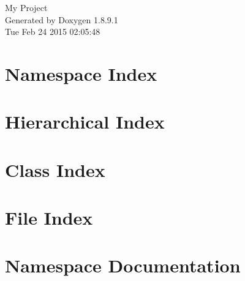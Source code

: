 \documentclass[twoside]{book}
\newcommand{\+}{\discretionary{\mbox{\scriptsize$\hookleftarrow$}}{}{}}
\newcommand{\clearemptydoublepage}{%
  \newpage{\pagestyle{empty}\cleardoublepage}%
}
\begin{document}
\hypersetup{pageanchor=false,
             bookmarks=true,
             bookmarksnumbered=true,
             pdfencoding=unicode
            }
\begin{titlepage}
\vspace*{7cm}
\begin{center}%
{\Large My Project }\\
\vspace*{1cm}
{\large Generated by Doxygen 1.8.9.1}\\
\vspace*{0.5cm}
{\small Tue Feb 24 2015 02:05:48}\\
\end{center}
\end{titlepage}
\clearemptydoublepage
\tableofcontents
\clearemptydoublepage
{}
\hypersetup{pageanchor=true}

\chapter{Namespace Index}

\chapter{Hierarchical Index}

\chapter{Class Index}

\chapter{File Index}

\chapter{Namespace Documentation}

















\end{document}
